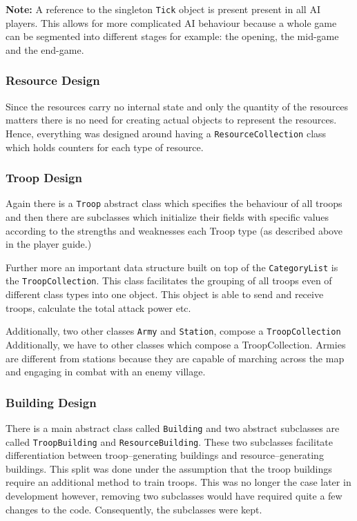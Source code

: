 \documentclass[12pt]{article}
\begin{document}
\textbf{Note:} A reference to the singleton \texttt{Tick} object
is present present in all AI players. This allows for more
complicated AI behaviour because a whole game can be segmented
into different stages for example: the opening, the mid-game and
the end-game.

\subsubsection{Resource Design}

Since the resources carry no internal state and only the
quantity of the resources matters there is no need for creating
actual objects to represent the resources. Hence, everything was
designed around having a \texttt{ResourceCollection} class which
holds counters for each type of resource.

\subsubsection{Troop Design}

Again there is a \texttt{Troop} abstract class which specifies
the behaviour of all troops and then there are subclasses which
initialize their fields with specific values according to the
strengths and weaknesses each Troop type (as described above in
the player guide.)

Further more an important data structure built on top of the
\texttt{CategoryList} is the \texttt{TroopCollection}. This
class facilitates the grouping of all troops even of different
class types into one object. This object is able to send and
receive troops, calculate the total attack power etc.

Additionally, two other classes \texttt{Army} and
\texttt{Station}, compose a \texttt{TroopCollection}
Additionally, we have to other classes which compose a
TroopCollection. Armies are different from stations because they
are capable of marching across the map and engaging in combat
with an enemy village.

\subsubsection{Building Design}

There is a main abstract class called \texttt{Building} and two
abstract subclasses are called \texttt{TroopBuilding} and
\texttt{ResourceBuilding}. These two subclasses facilitate
differentiation between troop--generating buildings and
resource--generating buildings. This split was done under the
assumption that the troop buildings require an additional method
to train troops. This was no longer the case later in
development however, removing two subclasses would have required
quite a few changes to the code. Consequently, the subclasses
were kept.
\end{document}
